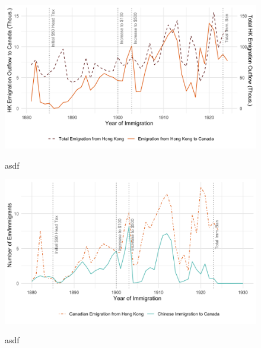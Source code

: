 \begin{figure}
    \centering 
    \caption{asdf}
    \includegraphics[width=\textwidth]{../../figs/fig2_flow_hkemig.png}
    \label{fig:hkemig}
\end{figure}

\begin{figure}
    \centering 
    \caption{asdf}
    \includegraphics[width=\textwidth]{../../figs/fig2_flow_immandem.png}
    \label{fig:immandem}
\end{figure}
